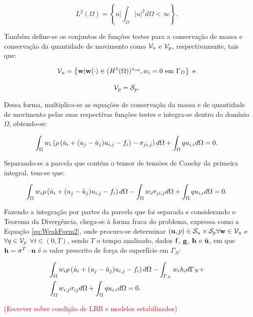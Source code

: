 \documentclass[_ArquivoPrincipal.tex]{subfiles}
\begin{document}
\begin{equation}
    L^2(\Omega)=\left\{u|\int_\Omega{|u|^2d\Omega}<\infty\right\}\text{.}
\end{equation}

Também define-se os conjuntos de funções testes para a conservação de massa e conservação da quantidade de movimento como $\mathcal{V}_u$ e $\mathcal{V}_p$, respectivamente, tais que:

\begin{equation}
    \mathcal{V}_u=\left\{\mathbf{w}|\mathbf{w}(\cdot)\in(H^1(\Omega))^{n_{sd}},w_i=0\text{ em }\Gamma_D\right\}\text{ e}
\end{equation}

\begin{equation}
    \mathcal{V}_p=\mathcal{S}_p\text{.}
\end{equation}

Dessa forma, multiplica-se as equações de conservação da massa e de quantidade de movimento pelas suas respectivas funções testes e integra-se dentro do domínio $\Omega$, obtendo-se:

\begin{equation}
    \int_{\Omega}{w_i\left({\rho\left({\dot{u}_i+(u_j-\hat{u}_j)u_{i,j}-f_i}\right)-\sigma_{ji,j}}\right) d\Omega}+\int_{\Omega}{qu_{i,i} d\Omega}=0\text{.}
\end{equation}

Separando-se a parcela que contém o tensor de tensões de Cauchy da primeira integral, tem-se que:

\begin{equation}
    \int_{\Omega}{w_i\rho\left({\dot{u}_i+(u_j-\hat{u}_j)u_{i,j}-f_i}\right) d\Omega}-\int_{\Omega}{w_i\sigma_{ji,j} d\Omega}+\int_{\Omega}{qu_{i,i} d\Omega}=0\text{.}
    \label{eq:WeakForm1}
\end{equation}

Fazendo a integração por partes da parcela que foi separada e considerando o Teorema da Divergência, chega-se à forma fraca do problema, expressa como a Equação \ref{eq:WeakForm2}, onde procura-se determinar $(\mathbf{u},p)\in\mathcal{S}_u\times\mathcal{S}_p\forall\mathbf{w}\in\mathcal{V}_u$ e $\forall q\in\mathcal{V}_p$ $\forall t\in(0,T)$, sendo $T$ o tempo analisado, dados $\mathbf{f}$, $\mathbf{g}$, $\mathbf{h}$ e $\hat{\mathbf{u}}$, em que $\mathbf{h}=\mathbf{\sigma}^T\cdot\mathbf{n}$ é o valor prescrito de força de superfície em $\Gamma_N$:

\begin{equation}
    \begin{split}
        &\int_{\Omega}{w_i\rho\left({\dot{u}_i+(u_j-\hat{u}_j)u_{i,j}-f_i}\right) d\Omega}-\int_{\Gamma_N}{w_ih_i d\Gamma_N}+\\
        &\int_{\Omega}{w_{i,j}\sigma_{ij} d\Omega}+\int_{\Omega}{qu_{i,i} d\Omega}=0\text{.}
    \end{split}
    \label{eq:WeakForm2}
\end{equation}

\textcolor{red}{(Escrever sobre condição de LBB e modelos estabilizados)}
\end{document}
